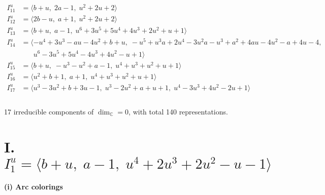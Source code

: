 \documentclass[1p]{elsarticle_modified}
\theoremstyle{definition}
\begin{document}
\begin{align*}
I^u_{11}&=\langle 
b+u,\;2 a-1,\;u^2+2 u+2\rangle \\
I^u_{12}&=\langle 
2 b- u,\;a+1,\;u^2+2 u+2\rangle \\
I^u_{13}&=\langle 
b+u,\;a-1,\;u^6+3 u^5+5 u^4+4 u^3+2 u^2+u+1\rangle \\
I^u_{14}&=\langle 
- u^4+3 u^3- a u-4 u^2+b+u,\;- u^5+u^3 a+2 u^4-3 u^2 a- u^3+a^2+4 a u-4 u^2- a+4 u-4,\\
\phantom{I^u_{14}}&\phantom{= \langle  }u^6-3 u^5+5 u^4-4 u^3+4 u^2- u+1\rangle \\
I^u_{15}&=\langle 
b+u,\;- u^3- u^2+a-1,\;u^4+u^3+u^2+u+1\rangle \\
I^u_{16}&=\langle 
u^2+b+1,\;a+1,\;u^4+u^3+u^2+u+1\rangle \\
I^u_{17}&=\langle 
u^3-3 u^2+b+3 u-1,\;u^3-2 u^2+a+u+1,\;u^4-3 u^3+4 u^2-2 u+1\rangle \\
\\
\end{align*}
\raggedright * 17 irreducible components of $\dim_{\mathbb{C}}=0$, with total 140 representations.\\
\newpage
\renewcommand{\arraystretch}{1}
\centering \section*{I. $I^u_{1}= \langle b+u,\;a-1,\;u^4+2 u^3+2 u^2- u-1 \rangle$}
\flushleft \textbf{(i) Arc colorings}\\
\end{document}

